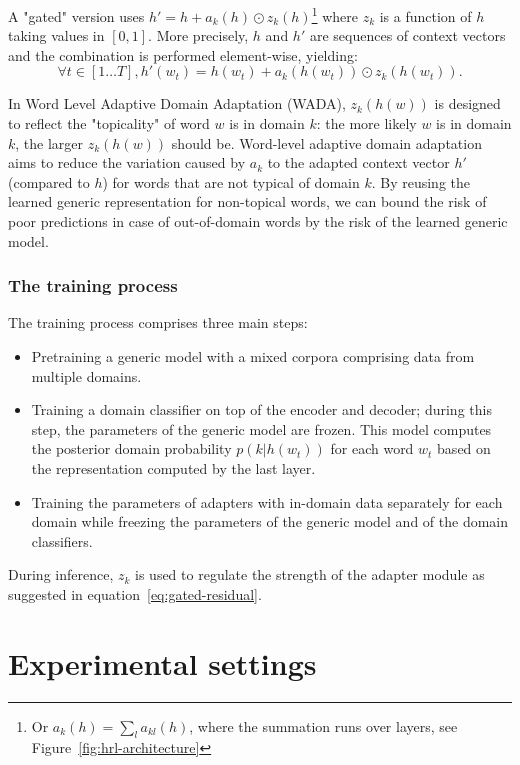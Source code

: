 \documentclass[11pt,a4paper]{article}
\begin{document}
A "gated" version uses $h' = h + a_k(h) \odot{} z_k(h)$\footnote{Or $a_k(h) = \sum_{l} a_{kl}(h)$, where the summation runs over layers, see Figure~\ref{fig:hrl-architecture}} where $z_k$ is a function of $h$ taking values in $[0,1]$. More precisely, $h$ and $h'$ are sequences of context vectors and the combination is performed element-wise, yielding:
\begin{equation}
   \forall t \in [1 \dots{} T], h'(w_t) = h(w_t) + a_k(h(w_t)) \odot{} z_k(h(w_t)). \label{eq:gated-residual}
\end{equation}

In Word Level Adaptive Domain Adaptation (WADA), $z_k(h(w))$ is designed to reflect the "topicality" of  word $w$ is in domain $k$: the more likely $w$ is in domain $k$, the larger $z_k(h(w))$ should be. Word-level adaptive domain adaptation aims to reduce the variation caused by $a_k$ to the adapted context vector $h'$ (compared to $h$) for words that are not typical of domain $k$. By reusing the learned generic representation for non-topical words, we can bound the risk of poor predictions in case of out-of-domain words by the risk of the learned generic model.

\subsubsection{The training process \label{sssec:train}}
The training process comprises three main steps:
\begin{itemize}
	\item Pretraining a generic model with a mixed corpora comprising data from multiple domains.
	\item Training a domain classifier on top of the encoder and decoder; during this step, the parameters of the generic model are frozen. This model computes the posterior domain probability $p(k|h(w_t))$ for each word $w_t$ based on the representation computed by the last layer.
	\item Training the parameters of adapters with in-domain data separately for each domain while freezing the parameters of the generic model and of the domain classifiers.
\end{itemize}
During inference, $z_k$ is used to regulate the strength of the adapter module as suggested in equation~\ref{eq:gated-residual}.

\section{Experimental settings \label{sec:exp}}
\end{document}
